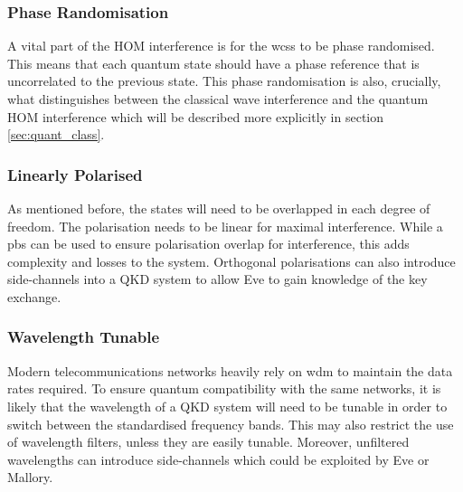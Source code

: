 
\subsubsection*{Phase Randomisation}

A vital part of the \ac{HOM} interference is for the \acp{wcs} to be phase randomised. This means that each quantum state should have a phase reference that is uncorrelated to the previous state. This phase randomisation is also, crucially, what distinguishes between the classical wave interference and the quantum \ac{HOM} interference which will be described more explicitly in section \ref{sec:quant_class}.


\subsubsection*{Linearly Polarised}

As mentioned before, the states will need to be overlapped in each degree of freedom. The polarisation needs to be linear for maximal interference. While a \ac{pbs} can be used to ensure polarisation overlap for interference, this adds complexity and losses to the system. Orthogonal polarisations can also introduce side-channels into a \ac{QKD} system to allow Eve to gain knowledge of the key exchange.

\subsubsection*{Wavelength Tunable}

Modern telecommunications networks heavily rely on \ac{wdm} to maintain the data rates required. To ensure quantum compatibility with the same networks, it is likely that the wavelength of a \ac{QKD} system will need to be tunable in order to switch between the standardised frequency bands. This may also restrict the use of wavelength filters, unless they are easily tunable. Moreover, unfiltered wavelengths can introduce side-channels which could be exploited by Eve or Mallory.

